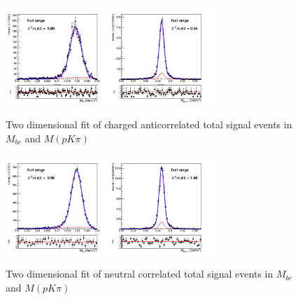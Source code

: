     

\begin{figure}
\centering

{\includegraphics[width=0.7\textwidth]{04-SimultaneousFit/figs/stream12345_TotalSignal_charged_anticorrLambdaC_2Dfit.png}}
\caption{Two dimensional fit of charged anticorrelated total signal events in $M_{bc}$  and $M(p K \pi)$ }
\label{fig:5streams_TotalSignal_charged_anticorrLambdaC_2Dfit}
\end{figure}


\begin{figure}
\centering
{\includegraphics[width=0.7\textwidth]{04-SimultaneousFit/figs/NEWstream01234_TotalSignal_neutral_corrLambdaC_2Dfit.png}}
\caption{Two dimensional fit of neutral correlated total signal events in $M_{bc}$  and $M(p K \pi)$ }
\label{fig:5streams_TotalSignal_neutral_corrLambdaC_2Dfit}
\end{figure}


